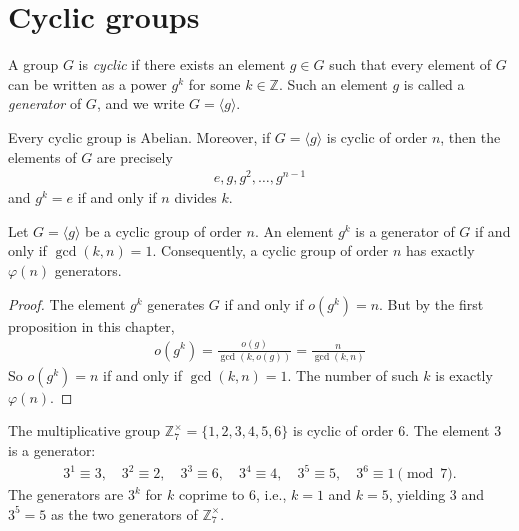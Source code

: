 \documentclass[a4paper, 12pt]{book} %
\begin{document}
\section{Cyclic groups}

\begin{definition}
    A group $G$ is \emph{cyclic} if there exists an element $g \in G$ such that every element of $G$ can be written as a power $g^k$ for some $k \in \mathbb{Z}$. Such an element $g$ is called a \emph{generator} of $G$, and we write $G = \langle g \rangle$.
\end{definition}

\begin{theorem}
    Every cyclic group is Abelian. Moreover, if $G = \langle g \rangle$ is cyclic of order $n$, then the elements of $G$ are precisely
    \begin{align}
        e, g, g^2, \ldots, g^{n-1}
    \end{align}
    and $g^k = e$ if and only if $n$ divides $k$.
\end{theorem}

\begin{proposition}
    Let $G = \langle g \rangle$ be a cyclic group of order $n$. An element $g^k$ is a generator of $G$ if and only if $\gcd(k, n) = 1$. Consequently, a cyclic group of order $n$ has exactly $\varphi(n)$ generators.
\end{proposition}

\begin{proof}
    The element $g^k$ generates $G$ if and only if $o(g^k) = n$. But by the first proposition in this chapter,
    \begin{align}
        o(g^k) = \frac{o(g)}{\gcd(k, o(g))} = \frac{n}{\gcd(k, n)}
    \end{align}
    So $o(g^k) = n$ if and only if $\gcd(k, n) = 1$. The number of such $k$ is exactly $\varphi(n)$.
\end{proof}

\begin{example}
    The multiplicative group $\mathbb{Z}_7^\times = \{1, 2, 3, 4, 5, 6\}$ is cyclic of order $6$. The element $3$ is a generator:
    \begin{align}
        3^1 \equiv 3, \quad 3^2 \equiv 2, \quad 3^3 \equiv 6, \quad 3^4 \equiv 4, \quad 3^5 \equiv 5, \quad 3^6 \equiv 1 \pmod 7.
    \end{align}
    The generators are $3^k$ for $k$ coprime to $6$, i.e., $k = 1$ and $k = 5$, yielding $3$ and $3^5 = 5$ as the two generators of $\mathbb{Z}_7^\times$.
\end{example}
\end{document}
